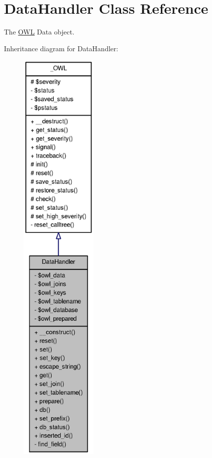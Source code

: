 \section{DataHandler Class Reference}
\label{classDataHandler}


The \hyperlink{classOWL}{OWL} Data object.  




Inheritance diagram for DataHandler:
\nopagebreak
\begin{figure}[H]
\begin{center}
\leavevmode
\includegraphics[height=600pt]{classDataHandler__inherit__graph}
\end{center}
\end{figure}


